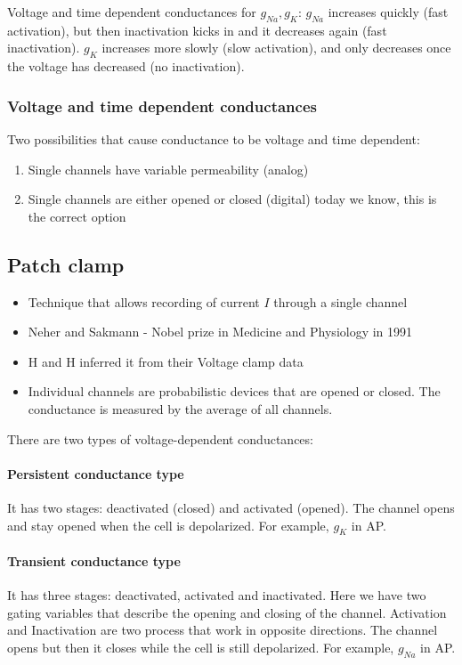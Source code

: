 \documentclass[main]{subfiles}
\begin{document}
Voltage and time dependent conductances for $g_{Na}, g_{K}$: 
$g_{Na}$ increases quickly (fast activation), but then inactivation kicks in and it decreases again (fast inactivation).
$g_K$ increases more slowly (slow activation), and only decreases once the voltage has decreased (no inactivation).

\subsubsection{Voltage and time dependent conductances}
Two possibilities that cause conductance to be voltage and time dependent:
\begin{enumerate}
\item Single channels have variable permeability (analog)
\item Single channels are either opened or closed (digital)
\subitem today we know, this is the correct option
\end{enumerate}

\subsection{Patch clamp}
\begin{itemize}
\item Technique that allows recording of current $I$ through a single channel
\item Neher and Sakmann - Nobel prize in Medicine and Physiology in 1991
\item H and H inferred it from their Voltage clamp data
\item Individual channels are probabilistic devices that are opened or closed. The conductance is measured by the average of all channels.
\end{itemize}

There are two types of voltage-dependent conductances:
\paragraph{Persistent conductance type} It has two stages: deactivated (closed) and activated (opened). The channel opens and stay opened when the cell is depolarized. For example, $g_K$ in AP.
\paragraph{Transient conductance type} It has three stages: deactivated, activated and inactivated. Here we have two gating variables that describe the opening and closing of the channel. Activation and Inactivation are two process that work in opposite directions. The channel opens but then it closes while the cell  is still depolarized. For example, $g_{Na}$ in AP.
\end{document}
